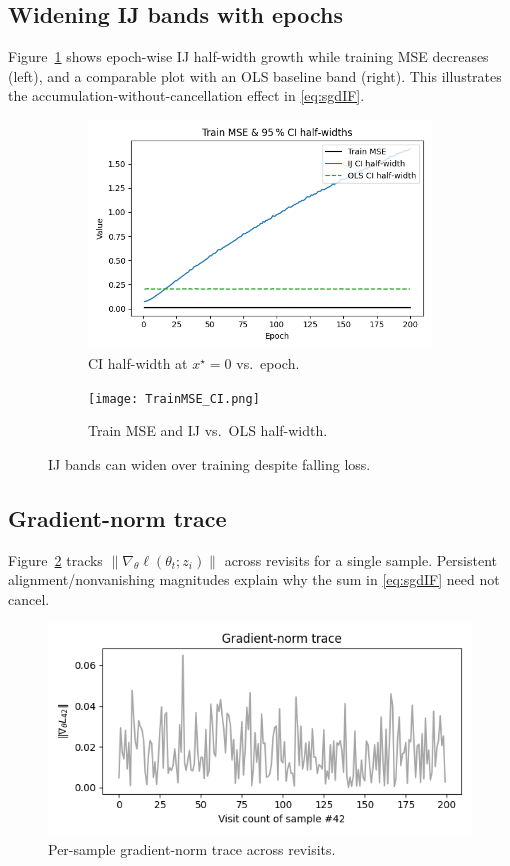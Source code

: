 \documentclass[11pt]{article}
\begin{document}
\subsection*{Widening IJ bands with epochs}
Figure~\ref{fig:width-epoch} shows epoch-wise IJ half-width growth while training MSE decreases (left), and a comparable plot with an OLS baseline band (right). This illustrates the accumulation-without-cancellation effect in \eqref{eq:sgdIF}.

\begin{figure}[t]
  \centering
  \begin{subfigure}{0.49\linewidth}
    \includegraphics[width=\linewidth]{CI_Half_Width.png}
    \caption{CI half-width at $x^\star{=}0$ vs.\ epoch.}
  \end{subfigure}\hfill
  \begin{subfigure}{0.49\linewidth}
    \texttt{[image: TrainMSE\_CI.png]} %
    \caption{Train MSE and IJ vs.\ OLS half-width.}
  \end{subfigure}
  \caption{IJ bands can widen over training despite falling loss.}
  \label{fig:width-epoch}
\end{figure}

\subsection*{Gradient-norm trace}
Figure~\ref{fig:trace} tracks $\|\nabla_\theta \ell(\theta_t;z_i)\|$ across revisits for a single sample. Persistent alignment/nonvanishing magnitudes explain why the sum in \eqref{eq:sgdIF} need not cancel.

\begin{figure}[t]
  \centering
  \includegraphics[width=0.8\linewidth]{Norm_Trace.png}
  \caption{Per-sample gradient-norm trace across revisits.}
  \label{fig:trace}
\end{figure}
\end{document}
